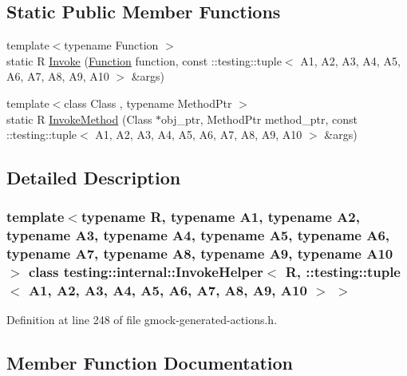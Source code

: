 \subsection*{Static Public Member Functions}
\begin{DoxyCompactItemize}
\item 
{\footnotesize template$<$typename Function $>$ }\\static R \hyperlink{classtesting_1_1internal_1_1InvokeHelper_3_01R_00_01_1_1testing_1_1tuple_3_01A1_00_01A2_00_01A3_9a04af5e172e051ec3c8faaa2f50b42f_ace511315f09d870d39aa3e07f73bfe13}{Invoke} (\hyperlink{structtesting_1_1internal_1_1Function}{Function} function, const \+::testing\+::tuple$<$ A1, A2, A3, A4, A5, A6, A7, A8, A9, A10 $>$ \&args)
\item 
{\footnotesize template$<$class Class , typename Method\+Ptr $>$ }\\static R \hyperlink{classtesting_1_1internal_1_1InvokeHelper_3_01R_00_01_1_1testing_1_1tuple_3_01A1_00_01A2_00_01A3_9a04af5e172e051ec3c8faaa2f50b42f_abb3ca4e2a681361685aca2b508fa13b8}{Invoke\+Method} (Class $\ast$obj\+\_\+ptr, Method\+Ptr method\+\_\+ptr, const \+::testing\+::tuple$<$ A1, A2, A3, A4, A5, A6, A7, A8, A9, A10 $>$ \&args)
\end{DoxyCompactItemize}


\subsection{Detailed Description}
\subsubsection*{template$<$typename R, typename A1, typename A2, typename A3, typename A4, typename A5, typename A6, typename A7, typename A8, typename A9, typename A10$>$\newline
class testing\+::internal\+::\+Invoke\+Helper$<$ R, \+::testing\+::tuple$<$ A1, A2, A3, A4, A5, A6, A7, A8, A9, A10 $>$ $>$}



Definition at line 248 of file gmock-\/generated-\/actions.\+h.



\subsection{Member Function Documentation}
\mbox{\label{classtesting_1_1internal_1_1InvokeHelper_3_01R_00_01_1_1testing_1_1tuple_3_01A1_00_01A2_00_01A3_9a04af5e172e051ec3c8faaa2f50b42f_ace511315f09d870d39aa3e07f73bfe13}} 
